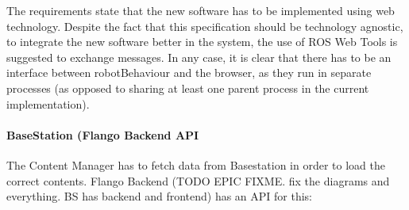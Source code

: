 The requirements state that the new software has to be implemented using web technology. 
Despite the fact that this specification should be technology agnostic, to integrate the new software better in the system, the use of ROS Web Tools is suggested to exchange messages.
In any case, it is clear that there has to be an interface between robotBehaviour and the browser, as they run in separate processes (as opposed to sharing at least one parent process in the current implementation).

\paragraph{BaseStation (Flango Backend API} The Content Manager has to fetch data from Basestation in order to load the correct contents.
Flango Backend (TODO EPIC FIXME. fix the diagrams and everything. BS has backend and frontend) has an API for this:

